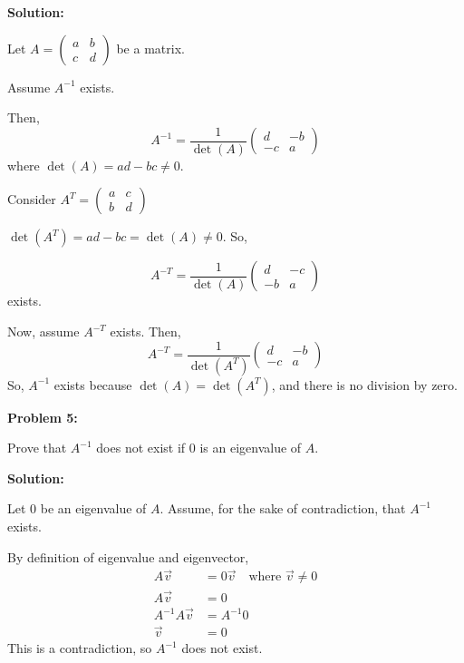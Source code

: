 \documentclass[12pt]{article}
\newenvironment{problem}[1]{
    \textbf{Problem #1:}
}{
    \rmfamily \vspace{1em}
}
\newenvironment{solution}{
    \textbf{Solution:}
    
}{
    
    \vspace{2em}
}
\begin{document}
\begin{solution}
    Let \(A = \begin{pmatrix}
        a & b \\
        c & d
    \end{pmatrix}\) be a matrix.

    Assume \(A^{-1}\) exists.

    Then,
    \[
        A^{-1} = \frac{1}{\det(A)}\begin{pmatrix}
            d & -b \\
            -c & a
        \end{pmatrix}
    \]
    where \(\det(A) = ad - bc \neq 0\).

    Consider \(A^T = \begin{pmatrix}
        a & c \\
        b & d
    \end{pmatrix}\)
    
    \(\det(A^T) = ad - bc = \det(A) \neq 0\). So,

    \[
        A^{-T} = \frac{1}{\det(A)}\begin{pmatrix}
            d & -c \\
            -b & a
        \end{pmatrix}
    \]
    exists.


    Now, assume \(A^{-T}\) exists. Then,
    \[
        A^{-T} = \frac{1}{\det(A^T)}\begin{pmatrix}
            d & -b \\
            -c & a
        \end{pmatrix}
    \]
    So, \(A^{-1}\) exists because \(\det(A) = \det(A^T)\), and there is no division by zero.
\end{solution}

\begin{problem}{5}
    Prove that \(A^{-1}\) does not exist if 0 is an eigenvalue of \(A\).
\end{problem}

\begin{solution}
    Let 0 be an eigenvalue of \(A\). Assume, for the sake of contradiction, that \(A^{-1}\) exists.

    By definition of eigenvalue and eigenvector,
    \[
        \begin{aligned}
            A\vec{v} &= 0\vec{v} \quad \text{where } \vec{v} \neq 0\\
            A\vec{v} &= 0\\
            A^{-1}A\vec{v} &= A^{-1}0\\
            \vec{v} &= 0
        \end{aligned}
    \]
    This is a contradiction, so \(A^{-1}\) does not exist.

\end{solution}
\end{document}
